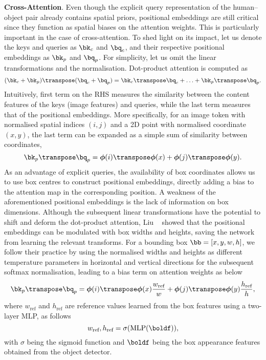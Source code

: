 \documentclass[10pt,twocolumn,letterpaper]{article}
\begin{document}
\textbf{Cross-Attention}.
Even though the explicit query representation of the human--object pair already contains spatial priors, positional embeddings are still critical since they function as spatial biases on the attention weights. This is particularly important in the case of cross-attention. To shed light on its impact, let us denote the keys and queries as $\bk_c$ and $\bq_c$, and their respective positional embeddings as $\bk_p$ and $\bq_p$. For simplicity, let us omit the linear transformations and the normalisation. Dot-product attention is computed as
\begin{equation}
   (\bk_c + \bk_p)\transpose (\bq_c + \bq_p) = {\bk_c}\transpose\bq_c + \ldots + {\bk_p}\transpose\bq_p.
   \label{eq:dot_p}
\end{equation}
Intuitively, first term on the RHS measures the similarity between the content features of the keys (image features) and queries, while the last term measures that of the positional embeddings. More specifically, for an image token with normalised spatial indices $(i, j)$ and a 2D point with normalised coordinate $(x, y)$, the last term can be expanded as a simple sum of similarity between coordinates,
\begin{equation}
   {\bk_p}\transpose\bq_p = \boldsymbol{\phi}(i)\transpose \boldsymbol{\phi}(x) + \boldsymbol{\phi}(j)\transpose \boldsymbol{\phi}(y).
\end{equation}
As an advantage of explicit queries, the availability of box coordinates allows us to use box centres to construct positional embeddings, directly adding a bias to the attention map in the corresponding position. A weakness of the aforementioned positional embeddings is the lack of information on box dimensions. Although the subsequent linear transformations have the potential to shift and deform the dot-product attention, Liu \etal~\cite{dab-detr} showed that the positional embeddings can be modulated with box widths and heights, saving the network from learning the relevant transforms. For a bounding box $\bb = [x, y, w, h]$, we follow their practice by using the normalised widths and heights as different temperature parameters in horizontal and vertical directions for the subsequent softmax normalisation, leading to a bias term on attention weights as below
\begin{equation}
   {\bk_p}\transpose\bq_p = \boldsymbol{\phi}(i)\transpose \boldsymbol{\phi}(x) \frac{w_\text{ref}}{w} + \boldsymbol{\phi}(j)\transpose \boldsymbol{\phi}(y) \frac{h_\text{ref}}{h},
   \label{eq:mod_attn}
\end{equation}
where $w_\text{ref}$ and $h_\text{ref}$ are reference values learned from the box features using a two-layer MLP, as follows
\begin{equation}
   w_\text{ref}, h_\text{ref} = \sigma(\text{MLP}(\boldf)),
\end{equation}
with $\sigma$ being the sigmoid function and $\boldf$ being the box appearance features obtained from the object detector.
\end{document}
